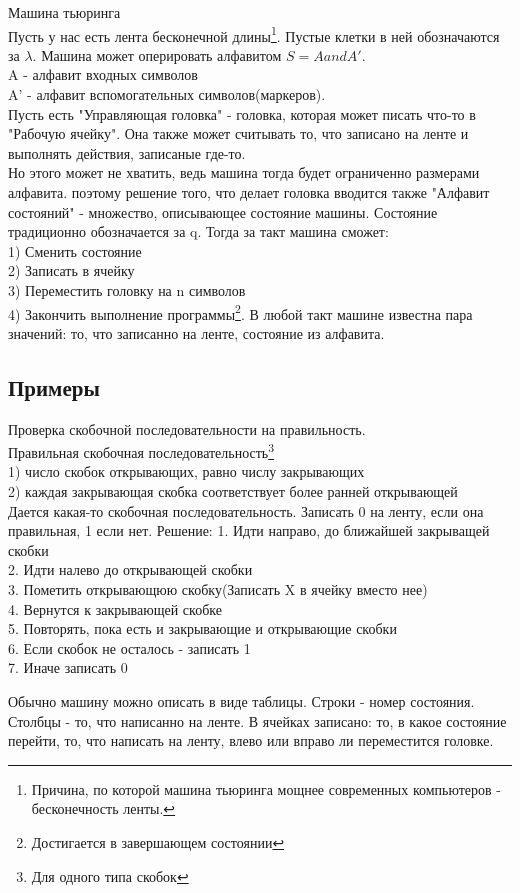 \documentclass[a4paper,12pt]{article}
\begin{document}
Машина тьюринга\\
Пусть у нас есть лента бесконечной длины\footnote{Причина, по которой машина тьюринга мощнее современных компьютеров - бесконечность ленты.}. Пустые клетки в ней обозначаются за $\lambda$. Машина может оперировать алфавитом $S=A and A'$. \\
A - алфавит входных символов\\
A' - алфавит вспомогательных символов(маркеров).\\
Пусть есть "Управляющая головка" - головка, которая может писать что-то в "Рабочую ячейку". Она также может считывать то, что записано на ленте и выполнять действия, записаные где-то.\\
Но этого может не хватить, ведь машина тогда будет ограниченно размерами алфавита.  поэтому решение того, что делает головка вводится также "Алфавит состояний" - множество, описывающее состояние машины. Состояние традиционно обозначается за q. Тогда за такт машина сможет:\\
1) Сменить состояние\\
2) Записать в ячейку\\
3) Переместить головку на n символов\\
4) Закончить выполнение программы\footnote{Достигается в завершающем состоянии}.
В любой такт машине известна пара значений: то, что записанно на ленте, состояние из алфавита.
\subsection{Примеры}
Проверка скобочной последовательности на правильность.\\
Правильная скобочная последовательность\footnote{Для одного типа скобок}\\
1) число скобок открывающих, равно числу закрывающих\\
2) каждая закрывающая скобка соответствует более ранней открывающей\\
Дается какая-то скобочная последовательность.
Записать 0 на ленту, если она правильная, 1 если нет.
Решение:
1. Идти направо, до ближайшей закрыващей скобки\\
2. Идти налево до открывающей скобки\\
3. Пометить открывающюю скобку(Записать X в ячейку вместо нее)\\
4. Вернутся к закрывающей скобке\\
5. Повторять, пока есть и закрывающие и открывающие скобки\\
6. Если скобок не осталось - записать 1\\
7. Иначе записать 0

Обычно машину можно описать в виде таблицы. Строки - номер состояния. Столбцы - то, что написанно на ленте. В ячейках записано: то, в какое состояние перейти, то, что написать на ленту, влево или вправо ли переместится головке.    
\end{document}
